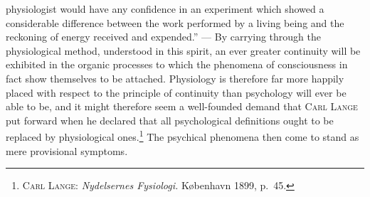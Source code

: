 \documentclass[12pt,a4paper]{book}
\begin{document}
physiologist would have any confidence in an experiment which showed a
considerable difference between the work performed by a living being and the
reckoning of energy received and expended.'' --- By carrying through the
physiological method, understood in this spirit, an ever greater continuity will
be exhibited in the organic processes to which the phenomena of consciousness
in fact show themselves to be attached. Physiology is therefore far more happily
placed with respect to the principle of continuity than psychology will ever be
able to be, and it might therefore seem a well-founded demand that \textsc{Carl
Lange} put forward when he declared that all psychological definitions ought to
be replaced by physiological ones.\footnote{\textsc{Carl Lange}:
\textit{Nydelsernes Fysiologi.} København 1899, p.~45.} The psychical phenomena
then come to stand as mere provisional symptoms.
\end{document}
